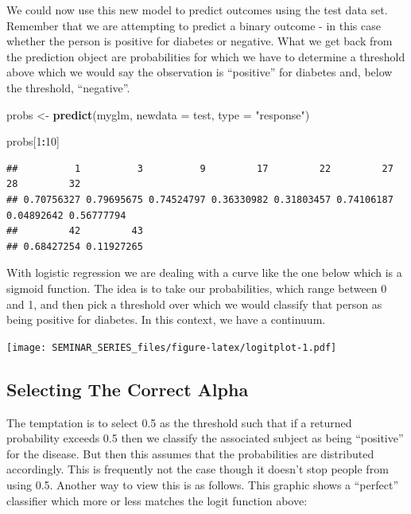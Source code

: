 \documentclass[
]{book}
\newenvironment{Shaded}{\begin{snugshade}}{\end{snugshade}}
\newcommand{\DataTypeTok}[1]{\textcolor[rgb]{0.13,0.29,0.53}{#1}}
\newcommand{\DecValTok}[1]{\textcolor[rgb]{0.00,0.00,0.81}{#1}}
\newcommand{\KeywordTok}[1]{\textcolor[rgb]{0.13,0.29,0.53}{\textbf{#1}}}
\newcommand{\NormalTok}[1]{#1}
\newcommand{\OperatorTok}[1]{\textcolor[rgb]{0.81,0.36,0.00}{\textbf{#1}}}
\newcommand{\StringTok}[1]{\textcolor[rgb]{0.31,0.60,0.02}{#1}}
\begin{document}
We could now use this new model to predict outcomes using the test data set. Remember that we are attempting to predict a binary outcome - in this case whether the person is positive for diabetes or negative. What we get back from the prediction object are probabilities for which we have to determine a threshold above which we would say the observation is ``positive'' for diabetes and, below the threshold, ``negative''.

\begin{Shaded}
\begin{Highlighting}[]
\NormalTok{probs <-}\StringTok{ }\KeywordTok{predict}\NormalTok{(myglm,}
                 \DataTypeTok{newdata =}\NormalTok{ test,}
                 \DataTypeTok{type =} \StringTok{"response"}\NormalTok{)}

\NormalTok{probs[}\DecValTok{1}\OperatorTok{:}\DecValTok{10}\NormalTok{]}
\end{Highlighting}
\end{Shaded}

\begin{verbatim}
##          1          3          9         17         22         27         28         32 
## 0.70756327 0.79695675 0.74524797 0.36330982 0.31803457 0.74106187 0.04892642 0.56777794 
##         42         43 
## 0.68427254 0.11927265
\end{verbatim}

With logistic regression we are dealing with a curve like the one below which is a sigmoid function. The idea is to take our probabilities, which range between 0 and 1, and then pick a threshold over which we would classify that person as being positive for diabetes. In this context, we have a continuum.

\texttt{[image: SEMINAR\_SERIES\_files/figure-latex/logitplot-1.pdf]}

\hypertarget{selecting-the-correct-alpha}{%
\subsection{Selecting The Correct Alpha}\label{selecting-the-correct-alpha}}

The temptation is to select 0.5 as the threshold such that if a returned probability exceeds 0.5 then we classify the associated subject as being ``positive'' for the disease. But then this assumes that the probabilities are distributed accordingly. This is frequently not the case though it doesn't stop people from using 0.5. Another way to view this is as follows. This graphic shows a ``perfect'' classifier which more or less matches the logit function above:
\end{document}
